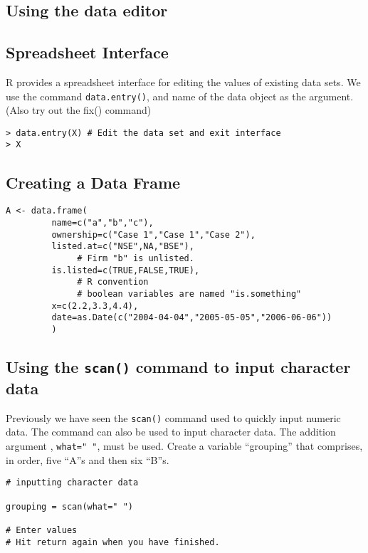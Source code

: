 \subsection*{Using the data editor}
\subsection*{Spreadsheet Interface}
R provides a spreadsheet interface for editing the values of existing data sets. We use the
command \texttt{data.entry()}, and name of the data object as the argument. (Also try out the
fix() command)
\begin{framed}
\begin{verbatim}
> data.entry(X) # Edit the data set and exit interface
> X

\end{verbatim}
\end{framed}



\subsection*{Creating a Data Frame}
\begin{framed}
\begin{verbatim}
A <- data.frame(
         name=c("a","b","c"),
         ownership=c("Case 1","Case 1","Case 2"),
         listed.at=c("NSE",NA,"BSE"),
              # Firm "b" is unlisted.
         is.listed=c(TRUE,FALSE,TRUE),
              # R convention
              # boolean variables are named "is.something"
         x=c(2.2,3.3,4.4),
         date=as.Date(c("2004-04-04","2005-05-05","2006-06-06"))
         )
\end{verbatim}
\end{framed}

\subsection*{Using the \texttt{scan()} command to input character data}
Previously we have seen the \texttt{scan()} command used to quickly input numeric data. The command can also be used to input character data. The addition argument , \texttt{what=" "}, must be used.  
Create a variable “grouping” that comprises, in order,  five “A”s and then six “B”s.

\begin{verbatim}
# inputting character data

grouping = scan(what=" ")

# Enter values
# Hit return again when you have finished.

\end{verbatim}


